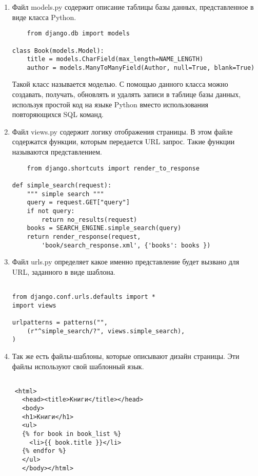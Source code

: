 \begin{enumerate}
	\item Файл models.py содержит описание таблицы базы данных, представленное в виде класса Python. 

{
\small \begin{verbatim}	
	from django.db import models

class Book(models.Model):
    title = models.CharField(max_length=NAME_LENGTH)
    author = models.ManyToManyField(Author, null=True, blank=True)
\end{verbatim}	
}	
	
	Такой класс называется моделью. С помощью данного класса можно создавать, получать, обновлять и удалять записи в таблице базы данных, используя простой код на языке Python вместо использования повторяющихся SQL команд.

	\item Файл views.py содержит логику отображения страницы. В этом файле содержатся функции, которым передается URL запрос. Такие функции называются представлением.
	
{
\small \begin{verbatim}	
	from django.shortcuts import render_to_response

def simple_search(request):
    """ simple search """
    query = request.GET["query"]
    if not query:
        return no_results(request)
    books = SEARCH_ENGINE.simple_search(query)
    return render_response(request,
        'book/search_response.xml', {'books': books })
\end{verbatim}	
}

	\item Файл urls.py определяет какое именно представление будет вызвано для URL, заданного в виде шаблона. 

{
\small \begin{verbatim}	

from django.conf.urls.defaults import *
import views

urlpatterns = patterns("",
    (r"^simple_search/?", views.simple_search),
)
\end{verbatim}	
}	
	
	\item Так же есть файлы-шаблоны, которые описывают дизайн страницы. Эти файлы используют свой шаблонный язык.
\end{enumerate}

{
    \small \begin{verbatim}	

    <html>
      <head><title>Книги</title></head>
      <body>
      <h1>Книги</h1>
      <ul>
      {% for book in book_list %}
        <li>{{ book.title }}</li>
      {% endfor %}
      </ul>
      </body></html>
\end{verbatim}	
}


